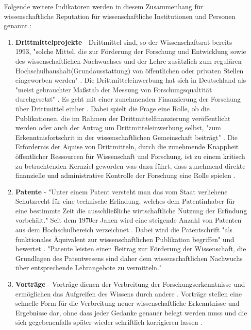 Folgende weitere Indikatoren werden in diesem Zusammenhang für wissenschaftliche Reputation für wissenschaftliche Institutionen und Personen genannt \cite{hanekop_2008}:
\begin{enumerate}
\item \textbf{Drittmittelprojekte} - Drittmittel sind, so der Wissenschaftsrat bereits 1993, "solche Mittel, die zur Förderung der Forschung und Entwicklung sowie des wissenschaftlichen Nachwuchses und der Lehre zusätzlich zum regulären Hochschulhaushalt(Grundausstattung) von öffentlichen oder privaten Stellen eingeworben werden" \cite{wr_2014}. Die Drittmitteleinwerbung hat sich in Deutschland als "meist gebrauchter Maßstab der Messung von Forschungsqualtität durchgesetzt" \cite{M_nch_2006}. Es geht mit einer zunehmenden Finanzierung der Forschung über Drittmittel einher \cite{Neidhardt_2010} \cite{Jansen_2007} \cite{simon_2009_wissenschaft_governance}. Dabei spielt die Frage eine Rolle, ob die Publikationen, die im Rahmen der Drittmittelfinanzierung veröffentlicht werden oder auch der Antrag um Drittmitteleinwerbung selbst, "zum Erkenntnisfortschrit in der wissenschaftlichen Gemeinschaft beiträgt" \cite{M_nch_2006}. Die Erfordernis der Aquise von Drittmitteln, durch die zunehmende Knappheit öffentlicher Ressourcen für Wissenschaft und Forschung, ist zu einem kritisch zu betrachtenden Kernziel geworden \cite{Jansen_2007} was dazu führt, dass zunehmend direkte finanzielle und administrative Kontrolle der Forschung eine Rolle spielen \cite{Barl_sius_2008}.
\item \textbf{Patente} - "Unter einem Patent versteht man das vom Staat verliehene Schutzrecht für eine technische Erfindung, welches dem Patentinhaber für eine bestimmte Zeit die ausschließliche wirtschaftliche Nutzung der Erfindung vorbehält." \cite{greif_2003_patente} Seit dem 1970er Jahen wird eine steigende Anzahl von Patenten aus dem Hochschulbereich verzeichnet \cite{schmoch_2003_hochschulforschung}. Dabei wird die Patentschrift "als funktionales Äquivalent zur wissenschaftlichen Publikation begriffen" und bewertet \cite{mersch_2014_patente}. "Patente leisten einen Beitrag zur Förderung der Wissenschaft, die Grundlagen des Patentwesens sind daher dem wissenschaftlichen Nachwuchs über entsprechende Lehrangebote zu vermitteln." \cite{suchen}
\item \textbf{Vorträge} - Vorträge dienen der Verbreitung der Forschungserkenntnisse und ermöglichen das Aufgreifen des Wissens durch andere \cite{rassenhoevel_2010_performancemessung}. Vorträge stellen eine schnelle Form für die Verbreitung neuer wissenschaftliche Erkenntnisse und Ergebnisse dar, ohne dass jeder Gedanke genauer belegt werden muss und die sich gegebenenfalls später wieder schriftlich korrigieren lassen \cite{haberle_2002_jahrbuch}. 

\end{enumerate}
